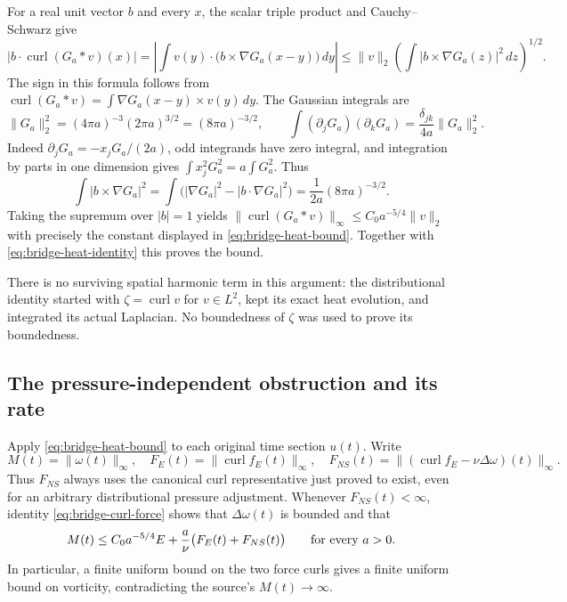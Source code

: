 For a real unit vector $b$ and every $x$, the scalar triple product
and Cauchy--Schwarz give
\[
 \left|b\cdot\operatorname{curl}(G_a*v)(x)\right|
   =\left|\int v(y)\cdot\bigl(b\times\nabla G_a(x-y)\bigr)\,dy\right|
   \le\|v\|_2\left(\int|b\times\nabla G_a(z)|^2\,dz\right)^{1/2}.
\]
The sign in this formula follows from
$\operatorname{curl}(G_a*v)=\int\nabla G_a(x-y)\times v(y)\,dy$.
The Gaussian integrals are
\[
 \|G_a\|_2^2
   =(4\pi a)^{-3}(2\pi a)^{3/2}=(8\pi a)^{-3/2},
 \qquad
 \int(\partial_jG_a)(\partial_kG_a)
       =\frac{\delta_{jk}}{4a}\|G_a\|_2^2.
\]
Indeed $\partial_jG_a=-x_jG_a/(2a)$, odd integrands have zero
integral, and integration by parts in one dimension gives
$\int x_j^2G_a^2=a\int G_a^2$.
Thus
\[
 \int|b\times\nabla G_a|^2
  =\int\bigl(|\nabla G_a|^2-|b\cdot\nabla G_a|^2\bigr)
  =\frac{1}{2a}(8\pi a)^{-3/2}.
\]
Taking the supremum over $|b|=1$ yields
$\|\operatorname{curl}(G_a*v)\|_\infty
 \le C_0a^{-5/4}\|v\|_2$ with precisely the constant displayed in
\eqref{eq:bridge-heat-bound}.  Together with
\eqref{eq:bridge-heat-identity} this proves the bound.

There is no surviving spatial harmonic term in this argument: the
distributional identity started with $\zeta=\operatorname{curl}v$ for
$v\in L^2$, kept its exact heat evolution, and integrated its actual
Laplacian.  No boundedness of $\zeta$ was used to prove its boundedness.

\subsection{The pressure-independent obstruction and its rate}

Apply \eqref{eq:bridge-heat-bound} to each original time section $u(t)$.
Write
\[
 M(t)=\|\omega(t)\|_\infty,\quad
 F_E(t)=\|\operatorname{curl}f_E(t)\|_\infty,\quad
 F_{NS}(t)=\|(\operatorname{curl}f_E-\nu\Delta\omega)(t)\|_\infty.
\]
Thus $F_{NS}$ always uses the canonical curl representative just proved
to exist, even for an arbitrary distributional pressure adjustment.
Whenever $F_{NS}(t)<\infty$, identity
\eqref{eq:bridge-curl-force} shows that
$\Delta\omega(t)$ is bounded and that
\begin{equation}\label{eq:bridge-direct-bound}
 M(t)\le C_0a^{-5/4}E+
                    \frac{a}{\nu}\bigl(F_E(t)+F_{NS}(t)\bigr)
 \qquad\hbox{for every }a>0.
\end{equation}
In particular, a finite uniform bound on the two force curls gives a
finite uniform bound on vorticity, contradicting the source's
$M(t)\longrightarrow\infty$.

